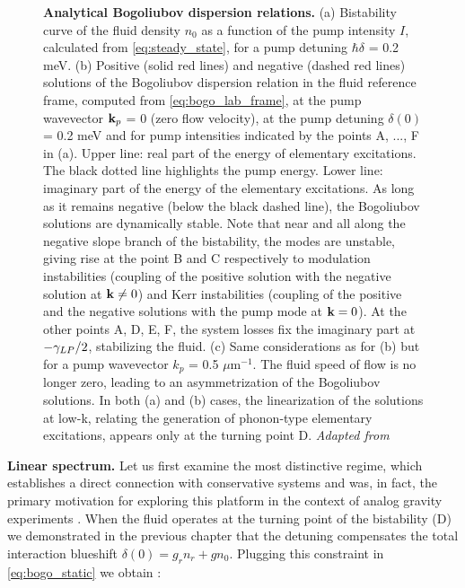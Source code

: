 \addtocounter{figure}{-1}
\begin{figure} 
    \caption{\textbf{Analytical Bogoliubov dispersion relations.} (a) Bistability curve of the fluid density $n_0$ as a function of the pump intensity $I$, calculated from \autoref{eq:steady_state}, for a pump detuning $\hbar\delta$ = 0.2 meV. (b) Positive (solid red lines) and negative (dashed red lines) solutions of the Bogoliubov dispersion relation in the fluid reference frame, computed from \autoref{eq:bogo_lab_frame}, at the pump wavevector $\mathbf{k}_p$ = 0 (zero flow velocity), at the pump detuning $\delta(0)$ = 0.2 meV and for pump intensities indicated by the points A, ..., F in (a). Upper line: real part of the energy of elementary excitations. The black dotted line highlights the pump energy. Lower line: imaginary part of the energy of the elementary excitations. As long as it remains negative (below the black dashed line), the Bogoliubov solutions are dynamically stable. Note that near and all along the negative slope branch of the bistability, the modes are unstable, giving rise at the point B and C respectively to modulation instabilities (coupling of the positive solution with the negative solution at $\mathbf{k} \neq 0$) and Kerr instabilities (coupling of the positive and the negative solutions with the pump mode at $\mathbf{k} = 0$). At the other points A, D, E, F, the system losses fix the imaginary part at $-\gamma_{LP}/2$, stabilizing the fluid. (c) Same considerations as for (b) but for a pump wavevector $k_p$ = 0.5 $\mu$m$^{-1}$. The fluid speed of flow is no longer zero, leading to an asymmetrization of the Bogoliubov solutions. In both (a) and (b) cases, the linearization of the solutions at low-k, relating the generation of phonon-type elementary excitations, appears only at the turning point D. \textit{Adapted from} \cite{claude_phd}}
    \label{fig:bist_et_bogo}
\end{figure}

\bigskip 

\textbf{Linear spectrum.}
Let us first examine the most distinctive regime, which establishes a direct connection with conservative systems and was, in fact, the primary motivation for exploring this platform in the context of analog gravity experiments \cite{claude_high-resolution_2022}.
When the fluid operates at the turning point of the bistability (D) we demonstrated in the previous chapter that the detuning compensates the total interaction blueshift $\delta(0)=g_rn_r + gn_0$. 
Plugging this constraint in \autoref{eq:bogo_static} we obtain :

